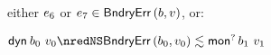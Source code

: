 {\begin{lamportproof*}
\begin{pfproof}
\begin{pfproof}
            \begin{pfproof}
              either $\sexpr_6$ or $\sexpr_7 \in \boundaryerror{\sbnd}{\svalue}$, or:
              \begin{mathpar}
              \end{mathpar}
            \end{pfproof}
        \end{pfproof}
        \begin{pfproof}
          \qedstep
            \begin{pfproof}
              $\edyn{\sbnd_0}{\svalue_0} \nredNS \rexpr{\boundaryerror{\sbnd_0}{\svalue_0}}{\emopt{\sbnd_1}{\svalue_1}}$
            \end{pfproof}
        \end{pfproof}
    \end{pfproof}


\end{lamportproof*}}
